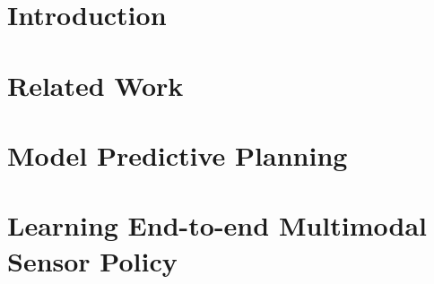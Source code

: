 \documentclass[hidelinks, 12pt]{cmuthesis}
\begin{document}
\begin{acknowledgments}

  
  
\end{acknowledgments}



\tableofcontents
\listoffigures
\listoftables

\mainmatter


%
%
%
%
%


\chapter{Introduction}


\chapter{Related Work} \label{chap:related_work}


\chapter{Model Predictive Planning} \label{chap:rrtplanner}


\chapter{Learning End-to-end Multimodal Sensor Policy} \label{chap:multimodalDRL}

\end{document}
